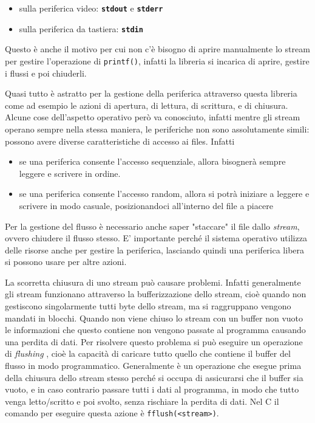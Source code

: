 \documentclass[
]{article}
\begin{document}
\begin{itemize}
\item
  sulla periferica video: \textbf{\texttt{stdout}} e
  \textbf{\texttt{stderr}}
\item
  sulla periferica da tastiera: \textbf{\texttt{stdin}}
\end{itemize}

Questo è anche il motivo per cui non c'è bisogno di aprire manualmente
lo stream per gestire l'operazione di \texttt{printf()}, infatti la
libreria si incarica di aprire, gestire i flussi e poi chiuderli.

Quasi tutto è astratto per la gestione della periferica attraverso
questa libreria come ad esempio le azioni di apertura, di lettura, di
scrittura, e di chiusura. Alcune cose dell'aspetto operativo però va
conosciuto, infatti mentre gli stream operano sempre nella stessa
maniera, le periferiche non sono assolutamente simili: possono avere
diverse caratteristiche di accesso ai files. Infatti

\begin{itemize}
\item
  se una periferica consente l'accesso sequenziale, allora bisognerà
  sempre leggere e scrivere in ordine.
\item
  se una periferica consente l'accesso random, allora si potrà iniziare
  a leggere e scrivere in modo casuale, posizionandoci all'interno del
  file a piacere
\end{itemize}

Per la gestione del flusso è necessario anche saper "staccare" il file
dallo \emph{stream}, ovvero chiudere il flusso stesso. E' importante
perché il sistema operativo utilizza delle risorse anche per gestire la
periferica, lasciando quindi una periferica libera si possono usare per
altre azioni.

La scorretta chiusura di uno stream può causare problemi. Infatti
generalmente gli stream funzionano attraverso la bufferizzazione dello
stream, cioè quando non gestiscono singolarmente tutti byte dello
stream, ma si raggruppano vengono mandati in blocchi. Quando non viene
chiuso lo stream con un buffer non vuoto le informazioni che questo
contiene non vengono passate al programma causando una perdita di dati.
Per risolvere questo problema si può eseguire un operazione di
\emph{flushing} , cioè la capacità di caricare tutto quello che contiene
il buffer del flusso in modo programmatico. Generalmente è un operazione
che esegue prima della chiusura dello stream stesso perché si occupa di
assicurarsi che il buffer sia vuoto, e in caso contrario passare tutti i
dati al programma, in modo che tutto venga letto/scritto e poi svolto,
senza rischiare la perdita di dati. Nel C il comando per eseguire questa
azione è \texttt{fflush(\textless{}stream\textgreater{})}.
\end{document}

